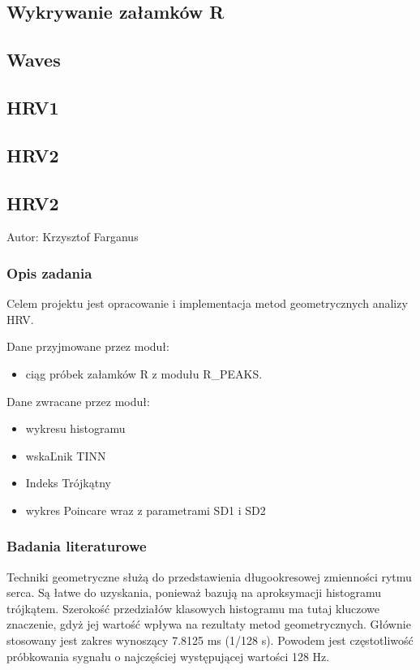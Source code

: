 \documentclass[a4paper, 11pt]{article}
\begin{document}
\subsection{Wykrywanie załamków R}
\label{sec:Rs}

\subsection{Waves}
\label{sec:waves}

\subsection{HRV1}
\label{sec:hrv1}

\subsection{HRV2}
\label{sec:hrv2}


\subsection{HRV2}
\label{sec:hrv2}

Autor: Krzysztof Farganus


\subsubsection{Opis zadania}
\label{sec:hrv2:desc}

Celem projektu jest opracowanie i implementacja metod geometrycznych
analizy HRV.

Dane przyjmowane przez moduł: 
\begin{itemize}
\item ciąg próbek załamków R z modułu R\_PEAKS.
\end{itemize}
Dane zwracane przez moduł:
\begin{itemize}
\item wykresu histogramu 
\item wskaĽnik TINN 
\item Indeks Trójkątny
\item wykres Poincare wraz z parametrami SD1 i SD2
\end{itemize}

\subsubsection{Badania literaturowe}
\label{sec:hrv2:papers}

Techniki geometryczne służą do przedstawienia długookresowej zmienności
rytmu serca. Są łatwe do uzyskania, ponieważ bazują na aproksymacji
histogramu trójkątem. Szerokość przedziałów klasowych histogramu ma
tutaj kluczowe znaczenie, gdyż jej wartość wpływa na rezultaty metod
geometrycznych. Głównie stosowany jest zakres wynoszący 7.8125 ms
(1/128 s). Powodem jest częstotliwość próbkowania sygnału o najczęściej
występującej wartości 128 Hz.
\end{document}
